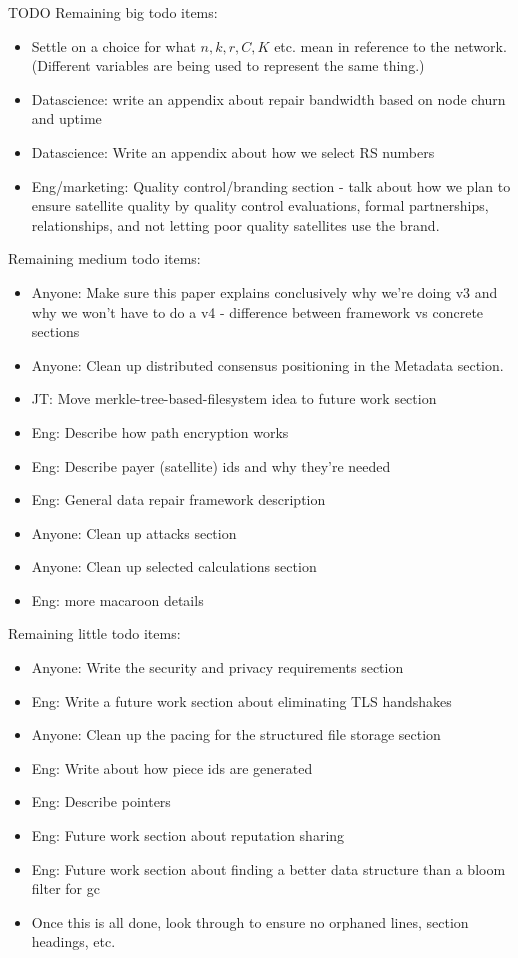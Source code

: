 \documentclass[a4paper,10pt]{article} \usepackage[utf8]{inputenc}
\newcommand{\todo}[1]{{\color{red} TODO #1 }}
\begin{document}
\todo{
Remaining big todo items:
\begin{itemize}
\item Settle on a choice for what $n,k,r,C,K$ etc. mean in reference to the 
network. (Different variables are being used to represent the same thing.)
\item Datascience: write an appendix about repair bandwidth based on node
  churn and uptime
\item Datascience: Write an appendix about how we select RS numbers
\item Eng/marketing: Quality control/branding section - talk about how we
  plan to ensure satellite quality by quality control evaluations, formal
  partnerships, relationships, and not letting poor quality satellites
  use the brand.
\end{itemize}

Remaining medium todo items:
\begin{itemize}
\item Anyone: Make sure this paper explains conclusively why we're doing v3 and
  why we won't have to do a v4 - difference between framework vs concrete
  sections
\item Anyone:
  Clean up distributed consensus positioning in the Metadata section.
\item JT: Move merkle-tree-based-filesystem idea to future work section
\item Eng: Describe how path encryption works
\item Eng: Describe payer (satellite) ids and why they're needed
\item Eng: General data repair framework description
\item Anyone: Clean up attacks section
\item Anyone: Clean up selected calculations section
\item Eng: more macaroon details
\end{itemize}

Remaining little todo items:
\begin{itemize}
\item Anyone: Write the security and privacy requirements section
\item Eng: Write a future work section about eliminating TLS handshakes
\item Anyone: Clean up the pacing for the structured file storage section
\item Eng: Write about how piece ids are generated
\item Eng: Describe pointers
\item Eng: Future work section about reputation sharing
\item Eng: Future work section about finding a better data structure than
 a bloom filter for gc
\item Once this is all done, look through to ensure no orphaned lines, 
section headings, etc.
\end{itemize}
}
\end{document}

